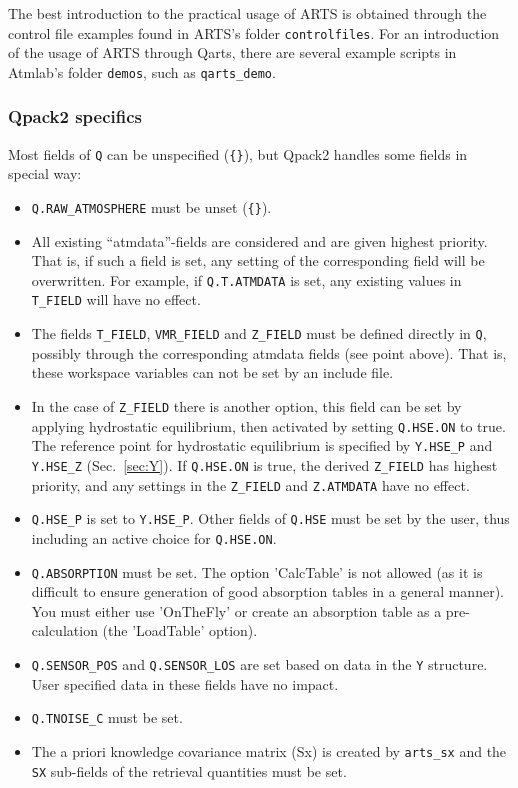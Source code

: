 \documentclass[a4paper,11pt]{article}
\begin{document}
The best introduction to the practical usage of ARTS is obtained through the
control file examples found in ARTS's folder \verb|controlfiles|. For an
introduction of the usage of ARTS through Qarts, there are several example
scripts in Atmlab's folder \verb|demos|, such as \verb|qarts_demo|.


\subsubsection{Qpack2 specifics}
%
Most fields of \verb|Q| can be unspecified (\verb|{}|), but Qpack2 handles some
fields in special way:
\begin{itemize}
\item \verb|Q.RAW_ATMOSPHERE| must be unset (\verb|{}|).
\item All existing ``atmdata''-fields are considered and are given highest
  priority. That is, if such a field is set, any setting of the corresponding
  field will be overwritten. For example, if \verb|Q.T.ATMDATA| is set, any
  existing values in \verb|T_FIELD| will have no effect.
\item The fields \verb|T_FIELD|, \verb|VMR_FIELD| and \verb|Z_FIELD| must
  be defined directly in \verb|Q|, possibly through the corresponding atmdata
  fields (see point above). That is, these workspace variables can not
  be set by an include file. 
\item In the case of \verb|Z_FIELD| there is another option, this field can be
  set by applying hydrostatic equilibrium, then activated by setting
  \verb|Q.HSE.ON| to true. The reference point for hydrostatic equilibrium is
  specified by \verb|Y.HSE_P| and \verb|Y.HSE_Z| (Sec.~\ref{sec:Y}). If 
  \verb|Q.HSE.ON| is true, the derived \verb|Z_FIELD| has highest priority, and
  any settings in the \verb|Z_FIELD| and \verb|Z.ATMDATA| have no effect.
\item \verb|Q.HSE_P| is set to \verb|Y.HSE_P|. Other fields of \verb|Q.HSE|
  must be set by the user, thus including an active choice for \verb|Q.HSE.ON|.
\item \verb|Q.ABSORPTION| must be set. The option 'CalcTable' is not allowed
  (as it is difficult to ensure generation of good absorption tables in a
  general manner). You must either use 'OnTheFly' or create an absorption table
  as a pre-calculation (the 'LoadTable' option).
\item \verb|Q.SENSOR_POS| and \verb|Q.SENSOR_LOS| are set based on data in the
  \verb|Y| structure. User specified data in these fields have no impact.
\item \verb|Q.TNOISE_C| must be set.
\item The a priori knowledge covariance matrix (Sx) is created by
  \verb|arts_sx| and the \verb|SX| sub-fields of the retrieval quantities must
  be set.
\end{itemize}
\end{document}
